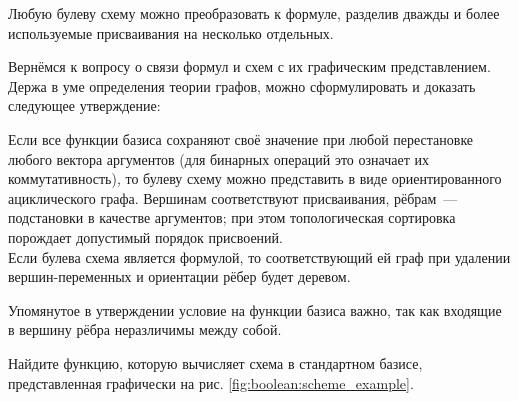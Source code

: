 \begin{statement}
    \label{statement:boolean:scheme_to_formula}
    Любую булеву схему можно преобразовать к формуле,
    разделив дважды и более используемые присваивания на несколько отдельных.
\end{statement}

Вернёмся к вопросу о связи формул и схем с их графическим представлением.
Держа в уме определения теории графов, можно сформулировать и доказать следующее утверждение:

\begin{statement}
    \label{statement:boolean:schemes_to_graphs}
    Если все функции базиса сохраняют своё значение при любой перестановке любого вектора аргументов
    (для бинарных операций это означает их коммутативность),
    то булеву схему можно представить в виде ориентированного ациклического графа.
    Вершинам соответствуют присваивания, рёбрам~--- подстановки в качестве аргументов;
    при этом топологическая сортировка порождает допустимый порядок присвоений.
    \\[0.25\baselineskip]
    Если булева схема является формулой,
    то соответствующий ей граф при удалении вершин-переменных и ориентации рёбер будет деревом.
\end{statement}

Упомянутое в утверждении условие на функции базиса важно,
так как входящие в вершину рёбра неразличимы между собой.

\begin{Exercise}[counter=SecExercise, label={exercise:boolean:graph_to_function}]
    \noindent
    Найдите функцию, которую вычисляет схема в стандартном базисе, представленная графически на рис. \ref{fig:boolean:scheme_example}.
\end{Exercise}

